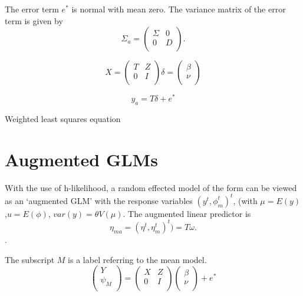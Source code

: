 \documentclass[12pt, a4paper]{article}
\begin{document}
The error term $e^{*}$ is normal with mean zero. The variance
matrix of the error term is given by
\begin{equation}
\Sigma_{a} = \left(%
\begin{array}{cc}
\Sigma & 0 \\
0 & D \\
\end{array}%
\right).
\end{equation}

\begin{equation}
X = \left(%
\begin{array}{cc}
T & Z \\
0 & I \\
\end{array}%
\right)
\delta = \left(%
\begin{array}{c}
\beta  \\
\nu  \\
\end{array}%
\right)
\end{equation}



\begin{equation}
y_{a} = T \delta + e^{*}
\end{equation}

Weighted least squares equation


\newpage




\section{Augmented GLMs} %


With the use of h-likelihood, a random effected model of the form can be viewed as an `augmented GLM' with the response variables $(y^t, \phi^t_m)^t$, (with $\mu = E(y)$,$ u = E(\phi)$, $var(y) = \theta V (\mu)$.
The augmented linear predictor is \[\eta_{ma}  = (\eta^t, \eta^t_m)^t) = T\omega. \].








The subscript $M$ is a label referring to the mean model.
\begin{equation}
\left(%
\begin{array}{c}
  Y \\
  \psi_{M} \\
\end{array}%
\right) = \left(
\begin{array}{cc}
  X & Z \\
  0 & I \\
\end{array}\right) \left(%
\begin{array}{c}
  \beta \\
  \nu \\
\end{array}%
\right)+ e^{*}
\end{equation}
\end{document}
